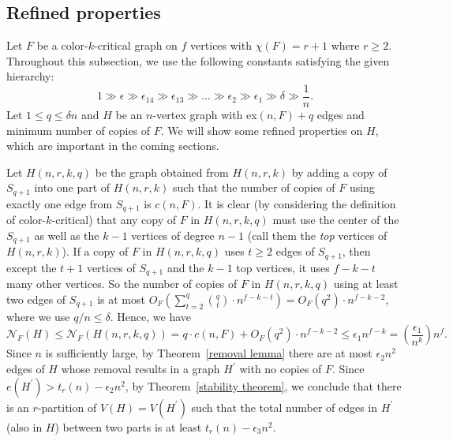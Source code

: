 \documentclass[10pt]{article}
\begin{document}
\subsection{Refined properties}\label{subsec:refined}
Let $F$ be a color-$k$-critical graph on $f$ vertices with $\chi(F)=r+1$ where $r\geq 2$.
Throughout this subsection, we use the following constants satisfying the given hierarchy:
$$ 1\gg\epsilon\gg\epsilon_{14}\gg  \epsilon_{13}\gg\ldots\gg\epsilon_2 \gg\epsilon_1\gg\delta \gg\frac{1}{n}.$$
Let $1\leq q\leq \delta n$ and $H$ be an $n$-vertex graph with ex$(n,F)+q$ edges and minimum number of copies of $F$.
We will show some refined properties on $H$, which are important in the coming sections.


Let $H(n,r,k,q)$ be the graph obtained from $H(n,r,k)$ by adding a copy of $S_{q+1}$ into one part of $H(n,r,k)$ such that the number of copies of $F$ using exactly one edge from $S_{q+1}$ is $c(n,F)$.
It is clear (by considering the definition of color-$k$-critical) that any copy of $F$ in $H(n,r,k,q)$ must use the center of the $S_{q+1}$ as well as the $k-1$ vertices of degree $n-1$ (call them the {\it top} vertices of $H(n,r,k)$).
If a copy of $F$ in $H(n,r,k,q)$ uses $t\geq 2$ edges of $S_{q+1}$, then except the $t+1$ vertices of $S_{q+1}$ and the $k-1$ top vertices, it uses $f-k-t$ many other vertices.
So the number of copies of $F$ in $H(n,r,k,q)$ using at least two edges of $S_{q+1}$ is at most $O_F\left(\sum_{t=2}^q \binom{q}{t}\cdot n^{f-k-t}\right)=O_F(q^2)\cdot n^{f-k-2}$, where we use $q/n\leq \delta$.
Hence, we have
\begin{equation}\label{low bound for H}
\mathcal{N}_F(H)\leq \mathcal{N}_F(H(n,r,k,q))=q\cdot c(n,F)+O_F(q^2)\cdot n^{f-k-2}\leq \epsilon_1 n^{f-k}=\left(\frac{\epsilon_1}{n^k}\right)n^f.
\end{equation}
Since $n$ is sufficiently large, by Theorem~\ref{removal lemma} there are at most $\epsilon_2 n^2$ edges of $H$ whose removal results in a graph $H^{\prime}$ with no copies of $F.$
Since $e(H^\prime)>t_r(n)-\epsilon_2n^2$, by Theorem~\ref{stability theorem},
we conclude that there is an $r$-partition of $V(H)=V(H^\prime)$ such that the total number of edges in $H^\prime$ (also in $H$) between two parts is at least $t_r(n)-\epsilon_3 n^2$.
\end{document}
